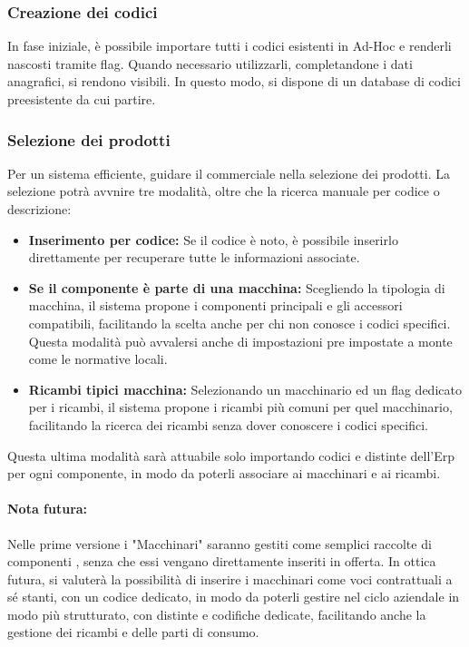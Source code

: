 \documentclass[12pt, a4paper]{article}
\begin{document}
\subsubsection{Creazione dei codici}

In fase iniziale, è possibile importare tutti i codici esistenti in Ad-Hoc e renderli nascosti tramite flag.
Quando necessario utilizzarli, completandone i dati anagrafici, si rendono visibili.
In questo modo, si dispone di un database di codici preesistente da cui partire.

\subsubsection{Selezione dei prodotti}

Per un sistema efficiente, guidare il commerciale nella selezione dei prodotti.
La selezione potrà avvnire tre modalità, oltre che la ricerca manuale per codice o descrizione:
\begin{itemize}
      \item \textbf{Inserimento per codice:} Se il codice è noto, è possibile inserirlo direttamente per recuperare tutte le informazioni associate.
      \item \textbf{Se il componente è parte di una macchina:} Scegliendo la tipologia di macchina, il sistema propone i componenti principali e gli accessori compatibili, facilitando la
      scelta anche per chi non conosce i codici specifici. Questa modalità può avvalersi anche di impostazioni pre impostate a monte come 
      le normative locali.
      \item \textbf{Ricambi tipici macchina:} Selezionando un macchinario ed un flag dedicato per i ricambi, il sistema propone i ricambi più comuni per quel macchinario,
      facilitando la ricerca dei ricambi senza dover conoscere i codici specifici.
\end{itemize}
Questa ultima modalità sarà attuabile solo importando codici e distinte dell'Erp per ogni componente, in modo da poterli associare ai macchinari e ai ricambi.
\paragraph{Nota futura:}
Nelle prime versione i "Macchinari" saranno gestiti come semplici raccolte di componenti , senza che essi vengano direttamente inseriti in offerta.
In ottica futura, si valuterà la possibilità di inserire i macchinari come voci contrattuali a sé stanti, con un codice dedicato,
in modo da poterli gestire nel ciclo aziendale in modo più strutturato, con distinte e codifiche dedicate, facilitando anche la gestione dei ricambi e delle parti di consumo.
\end{document}
